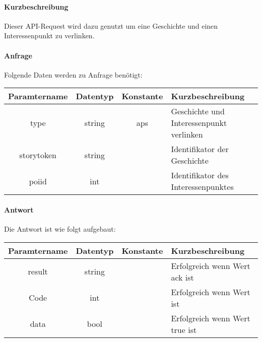 \paragraph{Kurzbeschreibung}Dieser API-Request wird dazu genutzt um eine Geschichte und einen Interessenpunkt zu verlinken.
\paragraph{Anfrage}Folgende Daten werden zu Anfrage benötigt:
\begin{table}[H]
	\begin{tabular}{|c|c|c|p{6.5cm}|}
		\hline
		\textbf{Paramtername} & \textbf{Datentyp} & \textbf{Konstante} & \textbf{Kurzbeschreibung}                                                                                               \\ \hline
		type                & string            & aps                & Geschichte und Interessenpunkt verlinken\\ \hline
		storytoken          & string            &                    & Identifikator der Geschichte \\ \hline
		poiid               & int               &                    & Identifikator des Interessenpunktes \\ \hline
	\end{tabular}
\end{table}
\paragraph{Antwort}Die Antwort ist wie folgt aufgebaut:
\begin{table}[H]
	\begin{tabular}{|c|c|c|p{6.5cm}|}
		\hline
		\textbf{Paramtername} & \textbf{Datentyp} & \textbf{Konstante} & \textbf{Kurzbeschreibung}                                                                                               \\ \hline
		result              & string           &                 & Erfolgreich wenn Wert {\glqq ack\grqq} ist \\ \hline
		Code                & int              &                 & Erfolgreich wenn Wert {\glqq 0\grqq} ist \\ \hline
		data                & bool             &                 & Erfolgreich wenn Wert {\glqq true\grqq} ist \\ \hline
	\end{tabular}
\end{table}

